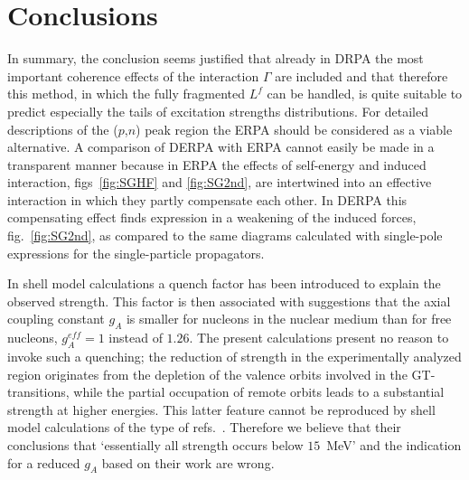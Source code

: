 \section{Conclusions}
In summary, the conclusion seems 
justified that already in DRPA the most important coherence effects of the 
interaction $\Gamma$ are included and that therefore this method, in which 
the fully fragmented $L^f$ can be handled, is quite suitable to predict 
especially the tails of excitation strengths distributions. For detailed 
descriptions of the ($p$,$n$) peak region the ERPA should be considered as 
a viable alternative. A comparison of DERPA with ERPA cannot easily be made in 
a transparent manner because in ERPA the effects of self-energy and induced 
interaction, figs~\ref{fig:SGHF} and \ref{fig:SG2nd}, are intertwined into an 
effective interaction in which they partly compensate each other. In DERPA 
this compensating effect finds expression in a weakening of the induced 
forces, fig.~\ref{fig:SG2nd}, as compared to the same diagrams calculated with 
single-pole expressions for the single-particle propagators.

In shell model calculations\cite{CZPM94,CPS95,LDR95} 
a quench factor has been introduced
to explain the observed strength. 
This factor is then associated with suggestions\cite{LDR95} that the axial 
coupling constant $g_A$ is smaller for nucleons in the nuclear medium than for 
free nucleons, $g_A^{eff}=1$ instead of $1.26$. The present calculations 
present no reason to invoke such a quenching; the reduction of strength in the 
experimentally analyzed region originates from the depletion of the valence 
orbits involved in the GT-transitions, while the partial occupation of remote 
orbits leads to a substantial strength at higher energies. This latter feature 
cannot be reproduced by shell model calculations of the type of 
refs.~\cite{CZPM94,CPS95,LDR95}. Therefore we believe that their conclusions
that `essentially all strength occurs below $15$~MeV' and the 
indication for a reduced $g_A$ based on their work are wrong.

